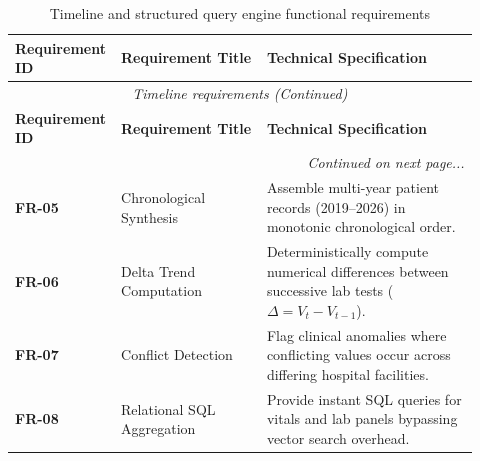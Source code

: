 \small
\begin{longtable}{@{}p{0.16\linewidth} p{0.31\linewidth} p{0.45\linewidth}@{}}
\caption{Timeline and structured query engine functional requirements}\label{tab:3_3_timeline_reqs} \\
\toprule
\textbf{Requirement ID} & \textbf{Requirement Title} & \textbf{Technical Specification} \\
\midrule
\endfirsthead
\toprule
\multicolumn{3}{c}{\small\textit{Timeline requirements (Continued)}} \\[4pt]
\midrule
\textbf{Requirement ID} & \textbf{Requirement Title} & \textbf{Technical Specification} \\
\midrule
\endhead
\midrule
\multicolumn{3}{r}{\footnotesize\textit{Continued on next page...}} \\
\bottomrule
\endfoot
\bottomrule
\endlastfoot
\textbf{FR-05} & Chronological Synthesis & Assemble multi-year patient records (2019--2026) in monotonic chronological order. \\
\midrule
\textbf{FR-06} & Delta Trend Computation & Deterministically compute numerical differences between successive lab tests ($\Delta = V_t - V_{t-1}$). \\
\midrule
\textbf{FR-07} & Conflict Detection & Flag clinical anomalies where conflicting values occur across differing hospital facilities. \\
\midrule
\textbf{FR-08} & Relational SQL Aggregation & Provide instant SQL queries for vitals and lab panels bypassing vector search overhead. \\
\bottomrule
\end{longtable}
\normalsize

